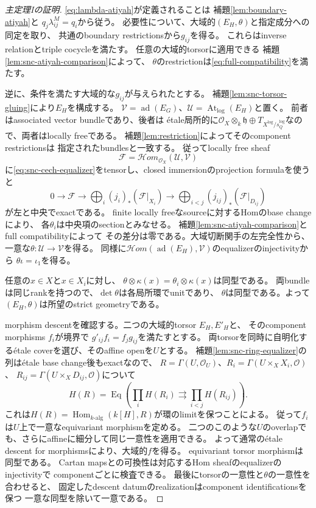 \documentclass[uplatex,dvipdfmx,11pt]{jsarticle}
\numberwithin{equation}{section}
\theoremstyle{plain}
\theoremstyle{definition}
\theoremstyle{remark}
\DeclareMathOperator{\At}{At}
\DeclareMathOperator{\ad}{ad}
\DeclareMathOperator{\Hom}{Hom}
\newcommand{\OO}{\mathcal O}
\newcommand{\h}{\mathfrak h}
\newcommand{\Tlog}{T_{X^{\log}/s_Q^{\log}}}
\newcommand{\Atlog}{\At_{\log}}
\begin{document}
\begin{proof}[主定理Iの証明]
\eqref{eq:lambda-atiyah}が定義されることは
補題\ref{lem:boundary-atiyah}と
$q_j\lambda^M_{ij}=q_i$から従う。
必要性について、大域的$(E_H,\theta)$と指定成分への同定を取り、
共通のboundary restrictionsから$g_{ij}$を得る。
これらはinverse relationとtriple cocycleを満たす。
任意の大域的torsorに適用できる
補題\ref{lem:snc-atiyah-comparison}によって、
$\theta$のrestrictionは\eqref{eq:full-compatibility}を満たす。

逆に、条件を満たす大域的な$g_{ij}$が与えられたとする。
補題\ref{lem:snc-torsor-gluing}により$E_H$を構成する。
$\mathcal V=\ad(E_G)$、$\mathcal U=\Atlog(E_H)$と置く。
前者はassociated vector bundleであり、後者は
étale局所的に$\OO_X\otimes_k\h\oplus\Tlog$なので、両者はlocally freeである。
補題\ref{lem:restriction}によってそのcomponent restrictionsは
指定されたbundlesと一致する。
従ってlocally free sheaf
\[
\mathscr F=\mathcal Hom_{\OO_X}(\mathcal U,\mathcal V)
\]
に\eqref{eq:snc-cech-equalizer}をtensorし、closed immersionのprojection formulaを使うと
\begin{equation}\label{eq:cartan-hom-equalizer}
0\longrightarrow\mathscr F\longrightarrow
\bigoplus_i(j_i)_*(\mathscr F|_{X_i})\longrightarrow
\bigoplus_{i<j}(j_{ij})_*(\mathscr F|_{D_{ij}})
\end{equation}
が左と中央でexactである。
finite locally freeなsourceに対するHomのbase changeにより、
各$\theta_i$は中央項のsectionとみなせる。
補題\ref{lem:snc-atiyah-comparison}とfull compatibilityによって
その差分は零である。大域切断関手の左完全性から、
一意な$\theta:\mathcal U\to\mathcal V$を得る。
同様に$\mathcal Hom(\ad(E_H),\mathcal V)$のequalizerのinjectivityから
$\theta\iota=\iota_1$を得る。

任意の$x\in X$と$x\in X_i$に対し、
$\theta\otimes\kappa(x)=\theta_i\otimes\kappa(x)$は同型である。
両bundleは同じrankを持つので、$\det\theta$は各局所環でunitであり、
$\theta$は同型である。よって$(E_H,\theta)$は所望のstrict geometryである。

morphism descentを確認する。二つの大域的torsor $E_H,E'_H$と、
そのcomponent morphisms $f_i$が境界で
$g'_{ij}f_i=f_jg_{ij}$を満たすとする。
両torsorを同時に自明化するétale coverを選び、そのaffine openを$U$とする。
補題\ref{lem:snc-ring-equalizer}の列はétale base change後もexactなので、
$R=\Gamma(U,\OO_U)$、$R_i=\Gamma(U\times_X X_i,\OO)$、
$R_{ij}=\Gamma(U\times_X D_{ij},\OO)$について
\[
H(R)=\operatorname{Eq}\left(
\prod_iH(R_i)\rightrightarrows\prod_{i<j}H(R_{ij})\right).
\]
これは$H(R)=\Hom_{k\text{-alg}}(k[H],R)$が環のlimitを保つことによる。
従って$f_i$は$U$上で一意なequivariant morphismを定める。
二つのこのような$U$のoverlapでも、さらにaffineに細分して同じ一意性を適用できる。
よって通常のétale descent for morphismsにより、大域的$f$を得る。
equivariant torsor morphismは同型である。
Cartan mapsとの可換性は対応するHom sheafのequalizerのinjectivityで
componentごとに検査できる。
最後にtorsorの一意性と$\theta$の一意性を合わせると、
固定したdescent datumのrealizationはcomponent identificationsを保つ
一意な同型を除いて一意である。
\end{proof}
\end{document}
